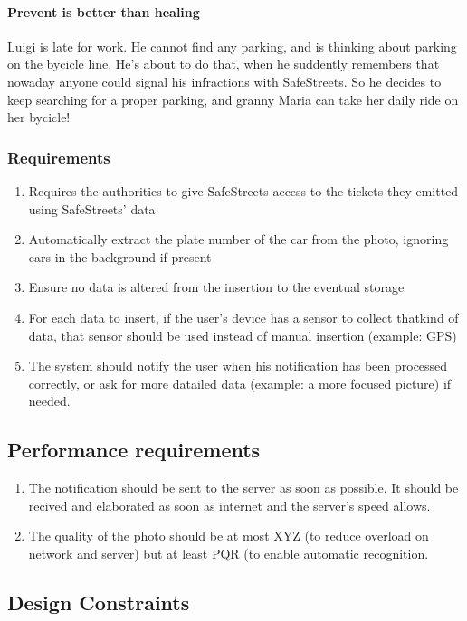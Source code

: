 \documentclass{article}
\newcommand{\enum}[1]{\texttt{#1.\arabic*}}
\begin{document}
			\paragraph{Prevent is better than healing}Luigi is late for work. He cannot find any parking, and is thinking about parking on the bycicle line. He's about to do that, when he suddently remembers that nowaday anyone could signal his infractions with SafeStreets. So he decides to keep searching for a proper parking, and granny Maria can take her daily ride on her bycicle!
		\subsubsection{Requirements}
			\begin{enumerate}[label=\enum{R}]
				\item \label{G_storeTickets}Requires the authorities to give SafeStreets access to the tickets they emitted using SafeStreets' data
				\item Automatically extract the plate number of the car from the photo, ignoring cars in the background if present
				\item Ensure no data is altered from the insertion to the eventual storage
				\item For each data to insert, if the  user's device has a sensor to collect thatkind of data, that sensor should be used instead of manual insertion (example: GPS)
				\item The system should notify the user when his notification has been processed correctly, or ask for more datailed data (example: a more focused picture) if needed.
			\end{enumerate}
	\subsection{Performance requirements}
		\begin{enumerate}
			\item The notification should be sent to the server as soon as possible. It should be recived and elaborated as soon as internet and the server's speed allows.
			\item The quality of the photo should be at most XYZ (to reduce overload on network and server) but at least PQR (to enable automatic recognition.
		\end{enumerate}
	\subsection{Design Constraints}
\end{document}
